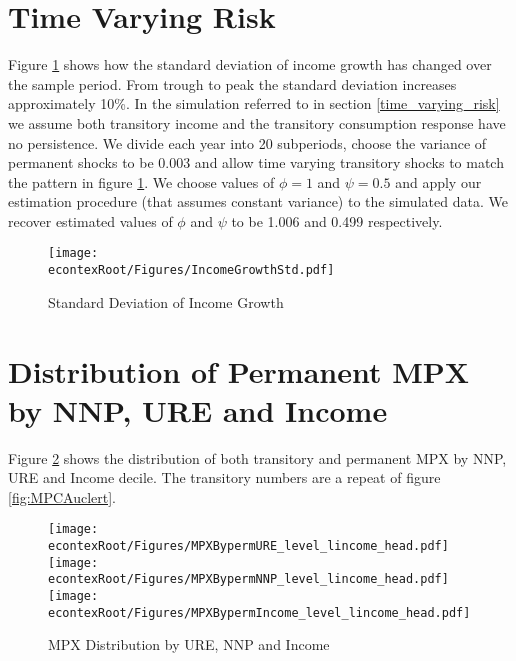 \documentclass[titlepage]{\econtex}\newcommand{\texname}{ConsumptionHeterogeneity}
\begin{document}
\section{Time Varying Risk} \label{time_varying_risk_appendix}
\setcounter{figure}{0}   
\setcounter{table}{0} 
Figure \ref{fig:income_growth_std} shows how the standard deviation of income growth has changed over the sample period. From trough to peak the standard deviation increases approximately 10\%. In the simulation referred to in section \ref{time_varying_risk} we assume both transitory income and the transitory consumption response have no persistence. We divide each year into 20 subperiods, choose the variance of permanent shocks to be 0.003 and allow time varying transitory shocks to match the pattern in figure \ref{fig:income_growth_std}. We choose values of $\phi=1$ and $\psi=0.5$ and apply our estimation procedure (that assumes constant variance) to the simulated data. We recover estimated values of $\phi$ and $\psi$ to be 1.006 and 0.499 respectively.
\begin{figure} 
	\begin{centering}
		\texttt{[image: \\econtexRoot/Figures/IncomeGrowthStd.pdf]}
		\caption{Standard Deviation of Income Growth}
		\label{fig:income_growth_std}
	\end{centering}
\end{figure}

\section{Distribution of Permanent MPX by NNP, URE and Income} \label{PermMPXbyURENNP}
\setcounter{figure}{0}   
\setcounter{table}{0} 
Figure \ref{fig:MPCAuclert_perm} shows the distribution of both transitory and permanent MPX by NNP, URE and Income decile. The transitory numbers are a repeat of figure \ref{fig:MPCAuclert}.
\begin{figure} 
	\begin{centering}
		\texttt{[image: \\econtexRoot/Figures/MPXBypermURE\_level\_lincome\_head.pdf]}
		\texttt{[image: \\econtexRoot/Figures/MPXBypermNNP\_level\_lincome\_head.pdf]}
		\texttt{[image: \\econtexRoot/Figures/MPXBypermIncome\_level\_lincome\_head.pdf]}
		\caption{MPX Distribution by URE, NNP and Income}
		\label{fig:MPCAuclert_perm}
	\end{centering}
\end{figure}
\end{document}
